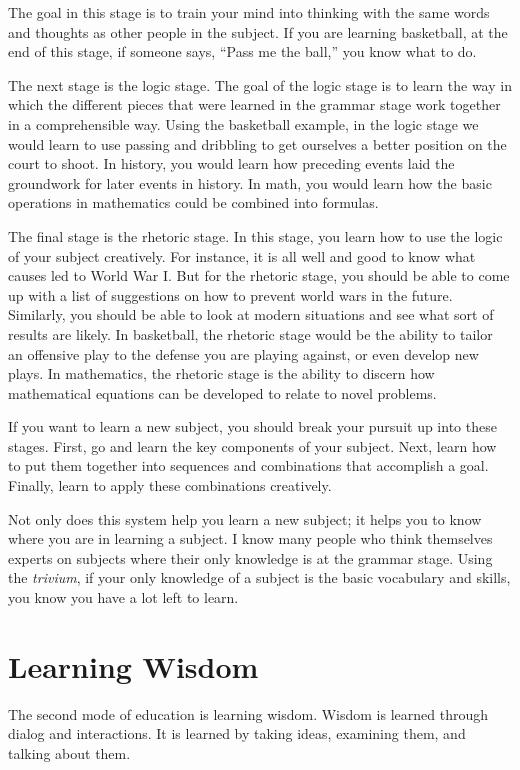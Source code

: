 The goal in this stage is to train your mind into thinking with the same
words and thoughts as other people in the subject. If you are learning
basketball, at the end of this stage, if someone says, “Pass me the
ball,” you know what to do.

The next stage is the logic stage. The goal of the logic stage is to
learn the way in which the different pieces that were learned in the
grammar stage work together in a comprehensible way. Using the
basketball example, in the logic stage we would learn to use passing
and dribbling to get ourselves a better position on the court to shoot.
In history, you would learn how preceding events laid the groundwork
for later events in history. In math, you would learn how the basic
operations in mathematics could be combined into formulas.

The final stage is the rhetoric stage. In this stage, you learn how to
use the logic of your subject creatively. For instance, it is all well
and good to know what causes led to World War I. But for the rhetoric
stage, you should be able to come up with a list of suggestions on how
to prevent world wars in the future. Similarly, you should be able to
look at modern situations and see what sort of results are likely. In
basketball, the rhetoric stage would be the ability to tailor an
offensive play to the defense you are playing against, or even develop
new plays. In mathematics, the rhetoric stage is the ability to discern
how mathematical equations can be developed to relate to novel
problems.

If you want to learn a new subject, you should break your pursuit up
into these stages. First, go and learn the key components of your
subject. Next, learn how to put them together into sequences and
combinations that accomplish a goal. Finally, learn to apply these
combinations creatively.

Not only does this system help you learn a new subject; it helps you to
know where you are in learning a subject. I know many people who think
themselves experts on subjects where their only knowledge is at the
grammar stage. Using the \textit{trivium}, if your only knowledge of a
subject is the basic vocabulary and skills, you know you have a lot
left to learn. 

\section{Learning Wisdom}

The second mode of education is learning wisdom. Wisdom is learned
through dialog and interactions. It is learned by taking ideas,
examining them, and talking about them. 


